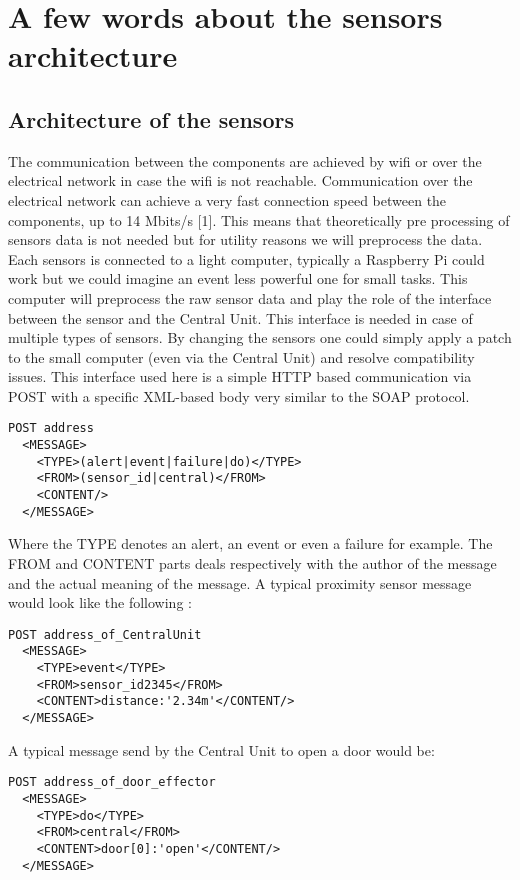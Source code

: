 \documentclass{acm_proc_article-sp}
\begin{document}
	
\section{A few words about the sensors architecture}
\subsection{Architecture of the sensors}
The communication between the components are achieved by wifi or over the electrical network in case the wifi is not reachable. 
Communication over the electrical network can achieve a very fast connection speed between the components, up to 14 Mbits/s [1]. 
This means that theoretically pre processing of sensors data is not needed but for utility reasons we will preprocess the data.
Each sensors is connected to a light computer, typically a Raspberry Pi could work but we could imagine an event less powerful one for small tasks. 
This computer will preprocess the raw sensor data and play the role of the interface between the sensor and the Central Unit. 
This interface is needed in case of multiple types of sensors. By changing the sensors one could simply apply a patch to the small computer (even via the Central Unit) and resolve compatibility issues. 
This interface used here is a simple HTTP based communication via POST with a  specific XML-based body very similar to the SOAP protocol.
\begin{verbatim}
POST address 
  <MESSAGE>
    <TYPE>(alert|event|failure|do)</TYPE>
    <FROM>(sensor_id|central)</FROM>
    <CONTENT/>
  </MESSAGE>
\end{verbatim}
Where the TYPE denotes an alert, an event or even a failure for example. 
The FROM and CONTENT parts deals respectively with the author of the message and the actual meaning of the message. 
A typical proximity sensor message would look like the following :
\begin{verbatim}
POST address_of_CentralUnit 
  <MESSAGE>
    <TYPE>event</TYPE>
    <FROM>sensor_id2345</FROM>
    <CONTENT>distance:'2.34m'</CONTENT/>
  </MESSAGE>
\end{verbatim}
A typical message send by the Central Unit to open a door would be:
\begin{verbatim}
POST address_of_door_effector
  <MESSAGE>
    <TYPE>do</TYPE>
    <FROM>central</FROM>
    <CONTENT>door[0]:'open'</CONTENT/>
  </MESSAGE> 
\end{verbatim}
\end{document}
